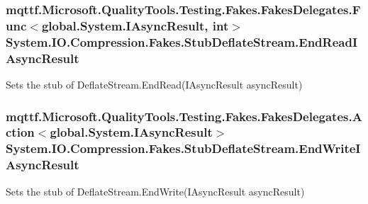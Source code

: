 \hypertarget{class_system_1_1_i_o_1_1_compression_1_1_fakes_1_1_stub_deflate_stream_a56c43549a7c85b4b146dd845a9094c71}{
\subsubsection[{End\-Read\-I\-Async\-Result}]{\setlength{\rightskip}{0pt plus 5cm}mqttf.\-Microsoft.\-Quality\-Tools.\-Testing.\-Fakes.\-Fakes\-Delegates.\-Func$<$global.\-System.\-I\-Async\-Result, int$>$ System.\-I\-O.\-Compression.\-Fakes.\-Stub\-Deflate\-Stream.\-End\-Read\-I\-Async\-Result}}\label{class_system_1_1_i_o_1_1_compression_1_1_fakes_1_1_stub_deflate_stream_a56c43549a7c85b4b146dd845a9094c71}


Sets the stub of Deflate\-Stream.\-End\-Read(\-I\-Async\-Result async\-Result)

\hypertarget{class_system_1_1_i_o_1_1_compression_1_1_fakes_1_1_stub_deflate_stream_a8b3027ee4c0680f244abebb50a881215}{
\subsubsection[{End\-Write\-I\-Async\-Result}]{\setlength{\rightskip}{0pt plus 5cm}mqttf.\-Microsoft.\-Quality\-Tools.\-Testing.\-Fakes.\-Fakes\-Delegates.\-Action$<$global.\-System.\-I\-Async\-Result$>$ System.\-I\-O.\-Compression.\-Fakes.\-Stub\-Deflate\-Stream.\-End\-Write\-I\-Async\-Result}}\label{class_system_1_1_i_o_1_1_compression_1_1_fakes_1_1_stub_deflate_stream_a8b3027ee4c0680f244abebb50a881215}


Sets the stub of Deflate\-Stream.\-End\-Write(\-I\-Async\-Result async\-Result)

